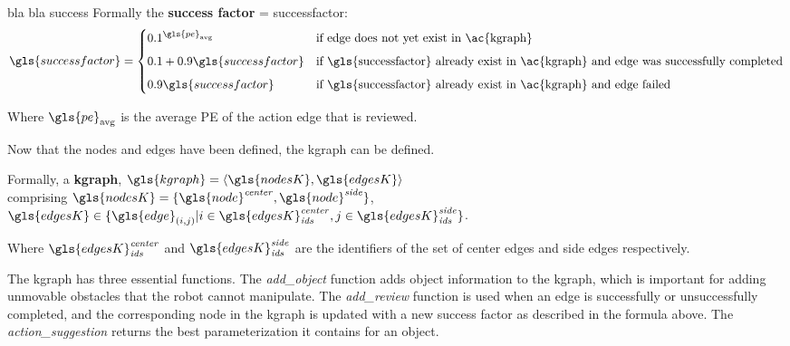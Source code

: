 bla bla success
Formally the \textbf{success factor} = \gls{successfactor}:
\[\gls{successfactor} =
  \begin{cases} 0.1^{\gls{pe}_\textrm{avg}}& \textrm{if edge does not yet exist in \ac{kgraph}}\\[5px]
    0.1 + 0.9\gls{successfactor} & \textrm{if \gls{successfactor} already exist in \ac{kgraph} and edge was successfully completed}\\[5px]
  0.9\gls{successfactor} & \textrm{if \gls{successfactor} already exist in \ac{kgraph} and edge failed}
\end{cases}\]

Where $\gls{pe}_\textrm{avg}$ is the average \ac{PE} of the action edge that is reviewed.

\noindent Now that the nodes and edges have been defined, the \ac{kgraph} can be defined.\bs



Formally, a \textbf{\acl{kgraph}}, $\gls{kgraph} = \left\langle \gls{nodesK}, \gls{edgesK} \right\rangle $
\\comprising $\gls{nodesK} = \{\gls{node}^{\mathit{center}}, \gls{node}^{\mathit{side}}\}$, \quad $\gls{edgesK} \in \{\gls{edge}_{(i,j)}| i \in \gls{edgesK}^\mathit{center}_\mathit{ids}, j \in \gls{edgesK}^\mathit{side}_\mathit{ids} \}$.\bs

Where $\gls{edgesK}^\mathit{center}_\mathit{ids}$ and $\gls{edgesK}^\mathit{side}_\mathit{ids}$ are the identifiers of the set of center edges and side edges respectively.\bs {}

The \ac{kgraph} has three essential functions. The \textit{add\_object} function adds object information to the \ac{kgraph}, which is important for adding unmovable obstacles that the robot cannot manipulate. The \textit{add\_review} function is used when an edge is successfully or unsuccessfully completed, and the corresponding node in the \ac{kgraph} is updated with a new success factor as described in the formula above. The \textit{action\_suggestion} returns the best parameterization it contains for an object.\bs
